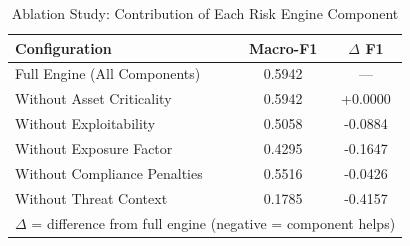 \begin{table}[htbp]
\centering
\caption{Ablation Study: Contribution of Each Risk Engine Component}
\label{tab:ablation}
\begin{tabular}{lcc}
\hline
\textbf{Configuration} & \textbf{Macro-F1} & \textbf{$\Delta$ F1} \\
\hline
Full Engine (All Components) & 0.5942 & --- \\
Without Asset Criticality & 0.5942 & +0.0000 \\
Without Exploitability & 0.5058 & -0.0884 \\
Without Exposure Factor & 0.4295 & -0.1647 \\
Without Compliance Penalties & 0.5516 & -0.0426 \\
Without Threat Context & 0.1785 & -0.4157 \\
\hline
\multicolumn{3}{l}{\small $\Delta$ = difference from full engine (negative = component helps)} \\
\end{tabular}
\end{table}